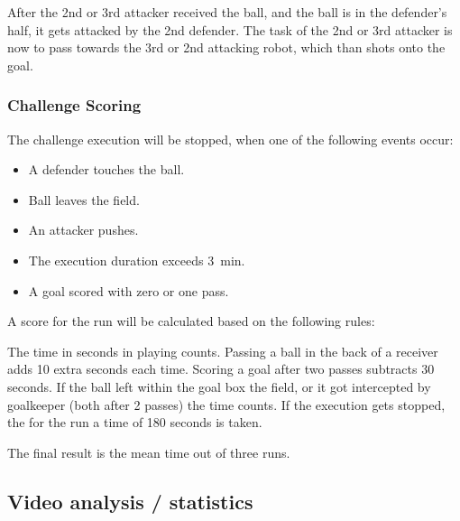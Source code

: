     After the 2nd or 3rd attacker received the ball, and the ball is in the defender's half, it gets attacked by the 2nd defender. The task of the 2nd or 3rd attacker is now to pass towards the 3rd or 2nd attacking robot, which than shots onto the goal.

    \subsubsection{Challenge Scoring}

    The challenge execution will be stopped, when one of the following events occur:

    \begin{itemize}
        \item A defender touches the ball.
        \item Ball leaves the field.
        \item An attacker pushes.
        \item The execution duration exceeds \qty{3}{\minute}.
        \item A goal scored with zero or one pass.
    \end{itemize}

    A score for the run will be calculated based on the following rules:

    The time in seconds in playing counts. Passing a ball in the back of a receiver adds 10 extra seconds each time. Scoring a goal after two passes subtracts 30 seconds.
    If the ball left within the goal box the field, or it got intercepted by goalkeeper (both after 2 passes) the time counts.
    If the execution gets stopped, the for the run a time of 180 seconds is taken.

    The final result is the mean time out of three runs.

\subsection{Video analysis / statistics}

